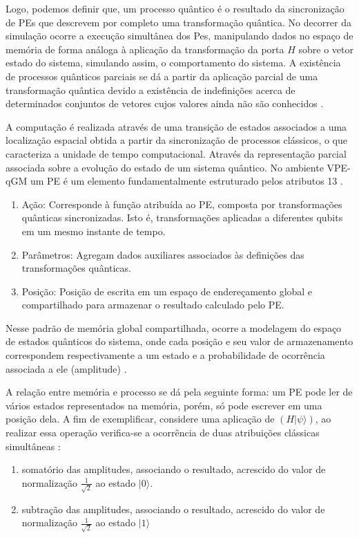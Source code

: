 \documentclass[tcc,capa]{texufpel}
\begin{document}
Logo, podemos definir que,  um processo quântico é o resultado da sincronização de PEs que descrevem por completo uma transformação quântica. No decorrer da simulação ocorre a execução simultânea dos Pes, manipulando dados no espaço de memória de forma análoga à aplicação da transformação da porta $H$ sobre o vetor estado do sistema, simulando assim, o comportamento do sistema. A existência de processos quânticos parciais se dá a partir da aplicação parcial de uma transformação quântica devido a existência de indefinições acerca de determinados conjuntos de vetores cujos valores ainda não são conhecidos \cite{maron:2013:ccgrid}. 

A computação é realizada através de uma transição de estados associados a uma localização espacial obtida a partir da sincronização de processos clássicos, o que caracteriza a unidade de tempo computacional. Através da representação parcial associada sobre a evolução do estado de um sistema quântico. No ambiente VPE-qGM um PE é um elemento fundamentalmente estruturado pelos atributos \cite{MARON12b}13 \cite{Schmalfuss14}.

\begin{enumerate}
    \item Ação: Corresponde à função atribuída ao PE, composta por transformações quânticas sincronizadas. Isto é, transformações aplicadas a diferentes qubits em um mesmo instante de tempo.
    \item Parâmetros: Agregam dados auxiliares associados às definições das transformações quânticas.
    \item Posição: Posição de escrita em um espaço de endereçamento global e compartilhado para armazenar o resultado calculado pelo PE.
\end{enumerate}

Nesse padrão de memória global compartilhada, ocorre a modelagem do espaço de estados quânticos do sistema, onde cada posição e seu valor de armazenamento correspondem respectivamente a um estado e a probabilidade de ocorrência associada a ele (amplitude) \cite{Schmalfuss14}.

A relação entre memória e processo se dá pela seguinte forma: um PE pode ler de vários estados representados na memória, porém, só pode escrever em uma posição dela. A fim de exemplificar, considere uma aplicação de $(H|\psi\rangle)$, ao realizar essa operação verifica-se a ocorrência de duas atribuições clássicas simultâneas \cite{maron:2013:ccgrid}:

\begin{enumerate}
    \item somatório das amplitudes, associando o resultado, acrescido do valor de normalização $\frac{1}{\sqrt{2}}$ ao estado $|0\rangle$.
    \item subtração das amplitudes, associando o resultado, acrescido do valor de normalização $\frac{1}{\sqrt{2}}$ ao estado $|1\rangle$
\end{enumerate}
\end{document}
